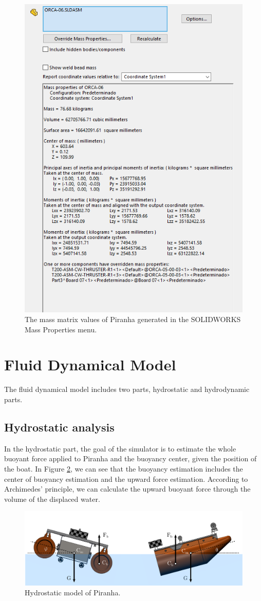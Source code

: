 \begin{figure}[ht]
    \centering
    \includegraphics[width=.5\textwidth]{images/04solidworks.png}
    \caption{The mass matrix values of Piranha generated in the SOLIDWORKS Mass Properties menu.}
    \label{fig:04mass}
\end{figure}

\section{Fluid Dynamical Model}

The fluid dynamical model includes two parts, hydrostatic and hydrodynamic parts.

\subsection{Hydrostatic analysis}

In the hydrostatic part, the goal of the simulator is to estimate the whole buoyant force applied to Piranha and the buoyancy center, given the position of the boat. In Figure \ref{fig:04smodel}, we can see that the buoyancy estimation includes the center of buoyancy estimation and the upward force estimation. According to Archimedes' principle, we can calculate the upward buoyant force through the volume of the displaced water. 


\begin{figure}
    \centering
    \includegraphics[width=.8\textwidth]{images/04hydrostatic.pdf}
    \caption{Hydrostatic model of Piranha.}
    \label{fig:04smodel}
\end{figure}

